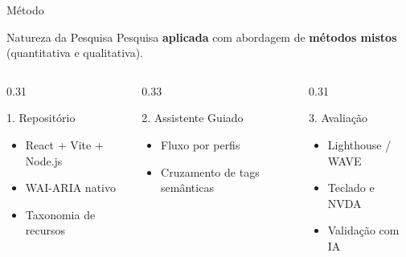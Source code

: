 \documentclass[aspectratio=169]{beamer}
\begin{document}
\begin{frame}{Método}
    \begin{block}{Natureza da Pesquisa}
        Pesquisa \textbf{aplicada} com abordagem de \textbf{métodos mistos} (quantitativa e qualitativa).
    \end{block}

    \vspace{0.15cm}

    \begin{columns}[T]
        \begin{column}{0.31\textwidth}
            \begin{block}{\small 1. Repositório}
                \begin{itemize}\footnotesize
                    \item React + Vite + Node.js
                    \item WAI-ARIA nativo
                    \item Taxonomia de recursos
                \end{itemize}
            \end{block}
        \end{column}
        \begin{column}{0.33\textwidth}
            \begin{block}{\small 2. Assistente Guiado}
                \begin{itemize}\footnotesize
                    \item Fluxo por perfis
                    \item Cruzamento de tags semânticas
                \end{itemize}
            \end{block}
        \end{column}
        \begin{column}{0.31\textwidth}
            \begin{block}{\small 3. Avaliação}
                \begin{itemize}\footnotesize
                    \item Lighthouse / WAVE
                    \item Teclado e NVDA
                    \item Validação com IA
                \end{itemize}
            \end{block}
        \end{column}
    \end{columns}

\end{frame}
\end{document}
